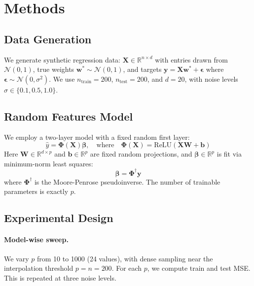 \documentclass[11pt]{article}
\begin{document}
\section{Methods}

\subsection{Data Generation}

We generate synthetic regression data: $\mathbf{X} \in \mathbb{R}^{n \times d}$ with entries drawn from $\mathcal{N}(0, 1)$, true weights $\mathbf{w}^* \sim \mathcal{N}(0, 1)$, and targets $\mathbf{y} = \mathbf{X}\mathbf{w}^* + \boldsymbol{\epsilon}$ where $\boldsymbol{\epsilon} \sim \mathcal{N}(0, \sigma^2)$. We use $n_{\text{train}} = 200$, $n_{\text{test}} = 200$, and $d = 20$, with noise levels $\sigma \in \{0.1, 0.5, 1.0\}$.

\subsection{Random Features Model}

We employ a two-layer model with a fixed random first layer:
\begin{equation}
    \hat{y} = \boldsymbol{\Phi}(\mathbf{X}) \boldsymbol{\beta}, \quad \text{where} \quad \boldsymbol{\Phi}(\mathbf{X}) = \text{ReLU}(\mathbf{X}\mathbf{W} + \mathbf{b})
\end{equation}
Here $\mathbf{W} \in \mathbb{R}^{d \times p}$ and $\mathbf{b} \in \mathbb{R}^p$ are fixed random projections, and $\boldsymbol{\beta} \in \mathbb{R}^{p}$ is fit via minimum-norm least squares:
\begin{equation}
    \boldsymbol{\beta} = \boldsymbol{\Phi}^{\dagger} \mathbf{y}
\end{equation}
where $\boldsymbol{\Phi}^{\dagger}$ is the Moore-Penrose pseudoinverse. The number of trainable parameters is exactly $p$.

\subsection{Experimental Design}

\paragraph{Model-wise sweep.} We vary $p$ from 10 to 1000 (24 values), with dense sampling near the interpolation threshold $p = n = 200$. For each $p$, we compute train and test MSE. This is repeated at three noise levels.
\end{document}
